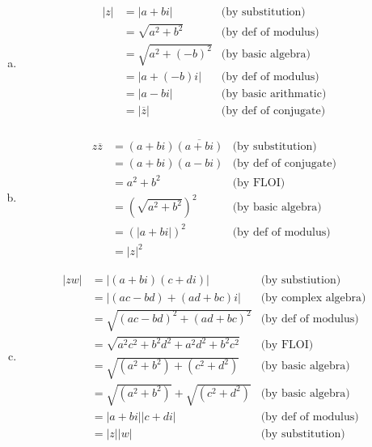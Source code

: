 \begin{enumerate}[(a)]
\item
\begin{align*}
\left|z\right| &= \left|a +  bi\right| &\text{(by substitution)}\\
&= \sqrt{a^{2} + b^{2}} &\text{(by def of modulus)}\\
&= \sqrt{a^{2} + (-b)^{2}} &\text{(by basic algebra)}\\
&= \left|a + (-b)i\right| &\text{(by def of modulus)}\\
&= \left|a - bi\right| &\text{(by basic arithmatic)}\\
&= \left|\overline{z}\right| &\text{(by def of conjugate)}\\
\end{align*}

\item
\begin{align*}
z \overline{z} &= (a + bi)\overline{(a + bi)} &\text{(by substitution)}\\
&= (a + bi)(a - bi) &\text{(by def of conjugate)}\\
&= a^{2} + b^{2} &\text{(by FLOI)}\\
&= (\sqrt{a^{2} + b^{2}})^{2} &\text{(by basic algebra)}\\
&= (\left|a + bi\right|)^{2} &\text{(by def of modulus)}\\
&= \left|z\right|^{2}
\end{align*}

\item 
\begin{align*}
\left|zw\right| &= \left|(a + bi)(c + di)\right| &\text{(by substiution)}\\
&= \left|(ac - bd) + (ad + bc)i\right| &\text{(by complex algebra)}\\
&= \sqrt{(ac - bd)^{2} + (ad + bc)^{2}} &\text{(by def of modulus)}\\
&= \sqrt{a^{2}c^{2} + b^{2}d^{2} + a^{2}d^{2} + b^{2}c^{2}} &\text{(by FLOI)}\\
&= \sqrt{(a^{2} + b^{2}) + (c^{2} + d^{2})} &\text{(by basic algebra)}\\
&= \sqrt{(a^{2} + b^{2})} + \sqrt{(c^{2} + d^{2})} &\text{(by basic algebra)}\\
&= \left|a + bi\right|\left|c + di\right| &\text{(by def of modulus)}\\
&= \left|z\right|\left|w\right| &\text{(by substitution)}
\end{align*}


\end{enumerate}

